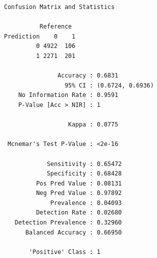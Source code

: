 \documentclass[
  letterpaper,
  DIV=11,
  numbers=noendperiod]{scrreprt}
\newenvironment{Shaded}{\begin{snugshade}}{\end{snugshade}}
\newcommand{\AttributeTok}[1]{\textcolor[rgb]{0.40,0.45,0.13}{#1}}
\newcommand{\CommentTok}[1]{\textcolor[rgb]{0.37,0.37,0.37}{#1}}
\newcommand{\DecValTok}[1]{\textcolor[rgb]{0.68,0.00,0.00}{#1}}
\newcommand{\FunctionTok}[1]{\textcolor[rgb]{0.28,0.35,0.67}{#1}}
\newcommand{\NormalTok}[1]{\textcolor[rgb]{0.00,0.23,0.31}{#1}}
\newcommand{\OtherTok}[1]{\textcolor[rgb]{0.00,0.23,0.31}{#1}}
\newcommand{\SpecialCharTok}[1]{\textcolor[rgb]{0.37,0.37,0.37}{#1}}
\newcommand{\StringTok}[1]{\textcolor[rgb]{0.13,0.47,0.30}{#1}}
\begin{document}
\begin{verbatim}
Confusion Matrix and Statistics

          Reference
Prediction    0    1
         0 4922  106
         1 2271  201
                                          
               Accuracy : 0.6831          
                 95% CI : (0.6724, 0.6936)
    No Information Rate : 0.9591          
    P-Value [Acc > NIR] : 1               
                                          
                  Kappa : 0.0775          
                                          
 Mcnemar's Test P-Value : <2e-16          
                                          
            Sensitivity : 0.65472         
            Specificity : 0.68428         
         Pos Pred Value : 0.08131         
         Neg Pred Value : 0.97892         
             Prevalence : 0.04093         
         Detection Rate : 0.02680         
   Detection Prevalence : 0.32960         
      Balanced Accuracy : 0.66950         
                                          
       'Positive' Class : 1               
                                          
\end{verbatim}

\begin{Shaded}
\end{Shaded}
\end{document}
